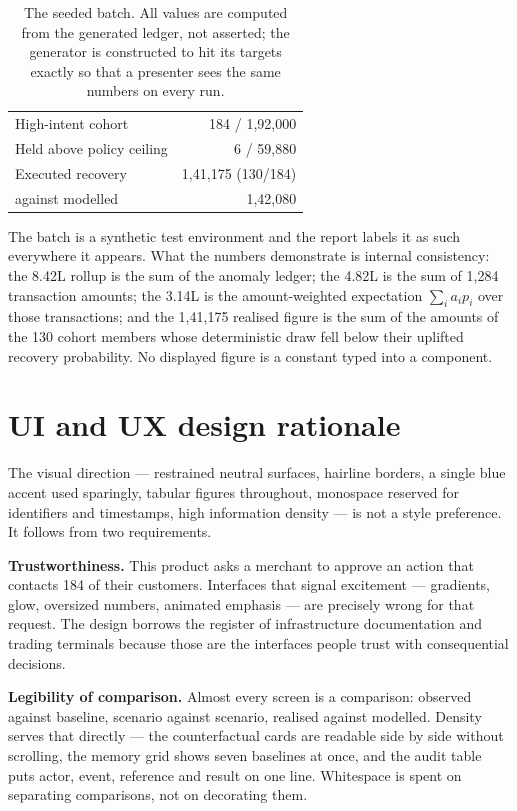 \documentclass[10pt,twocolumn,a4paper]{article}
\newcommand{\rs}{\rupee}%
\newcommand{\rs}{\textrm{INR}\,}%
\begin{document}
\begin{table}[h]
\begin{tabular}{@{}l r@{}}
High-intent cohort           & 184 / \rs{}1{,}92{,}000 \\
Held above policy ceiling    & 6 / \rs{}59{,}880 \\
Executed recovery            & \rs{}1{,}41{,}175 (130/184) \\
\quad against modelled       & \rs{}1{,}42{,}080 \\
\bottomrule
\end{tabular}
\caption{The seeded batch. All values are computed from the generated ledger,
not asserted; the generator is constructed to hit its targets exactly so that a
presenter sees the same numbers on every run.}
\label{tab:results}
\end{table}

The batch is a synthetic test environment and the report labels it as such
everywhere it appears. What the numbers demonstrate is internal consistency: the
\rs{}8.42L rollup is the sum of the anomaly ledger; the \rs{}4.82L is the sum of
1{,}284 transaction amounts; the \rs{}3.14L is the amount-weighted expectation
$\sum_i a_i p_i$ over those transactions; and the \rs{}1{,}41{,}175 realised
figure is the sum of the amounts of the 130 cohort members whose deterministic
draw fell below their uplifted recovery probability. No displayed figure is a
constant typed into a component.

\section{UI and UX design rationale}

The visual direction --- restrained neutral surfaces, hairline borders, a single
blue accent used sparingly, tabular figures throughout, monospace reserved for
identifiers and timestamps, high information density --- is not a style
preference. It follows from two requirements.

\textbf{Trustworthiness.} This product asks a merchant to approve an action that
contacts 184 of their customers. Interfaces that signal excitement --- gradients,
glow, oversized numbers, animated emphasis --- are precisely wrong for that
request. The design borrows the register of infrastructure documentation and
trading terminals because those are the interfaces people trust with
consequential decisions.

\textbf{Legibility of comparison.} Almost every screen is a comparison: observed
against baseline, scenario against scenario, realised against modelled. Density
serves that directly --- the counterfactual cards are readable side by side
without scrolling, the memory grid shows seven baselines at once, and the audit
table puts actor, event, reference and result on one line. Whitespace is spent on
separating comparisons, not on decorating them.
\end{document}
